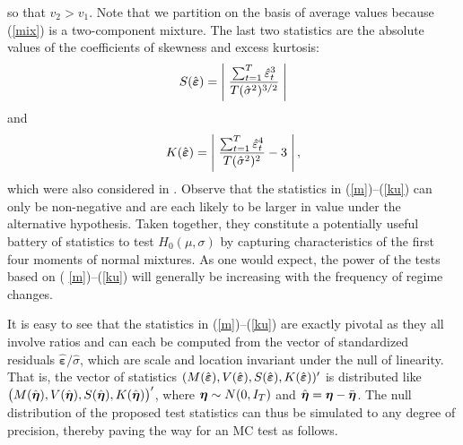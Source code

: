 \documentclass[11pt]{article}
\begin{document}
so that $v_{2}>v_{1}.$ Note that we partition on the basis of average values
because (\ref{mix}) is a two-component mixture. The last two statistics are
the absolute values of the coefficients of skewness and excess kurtosis: 
\begin{equation}
S(\hat{\boldsymbol{\varepsilon }})=\left\vert \;\frac{\sum_{t=1}^{T}\hat{%
\varepsilon}_{t}^{3}}{T(\hat{\sigma}^{2})^{3/2}}\;\right\vert   \label{sk}
\end{equation}%
and 
\begin{equation}
K(\hat{\boldsymbol{\varepsilon }})=\left\vert \;\frac{\sum_{t=1}^{T}\hat{%
\varepsilon}_{t}^{4}}{T(\hat{\sigma}^{2})^{2}}-3\;\right\vert ,  \label{ku}
\end{equation}%
which were also considered in \cite{Cho-White:2007}. Observe that the
statistics in (\ref{m})--(\ref{ku}) can only be non-negative and are each
likely to be larger in value under the alternative hypothesis. Taken
together, they constitute a potentially useful battery of statistics to test 
$H_{0}(\mu ,\sigma )$ by capturing characteristics of the first four moments
of normal mixtures. As one would expect, the power of the tests based on (%
\ref{m})--(\ref{ku}) will generally be increasing with the frequency of
regime changes.

It is easy to see that the statistics in (\ref{m})--(\ref{ku}) are exactly
pivotal as they all involve ratios and can each be computed from the vector
of standardized residuals $\hat{\boldsymbol{\varepsilon }}/\hat{\sigma}$,
which are scale and location invariant under the null of linearity. That is,
the vector of statistics $(M(\hat{\boldsymbol{\varepsilon }}),V(\hat{%
\boldsymbol{\varepsilon }}),S(\hat{\boldsymbol{\varepsilon }}),K(\hat{%
\boldsymbol{\varepsilon }}))^{\prime }$ is distributed like \sloppy$\big(M(%
\hat{\boldsymbol{\eta }}),V(\hat{\boldsymbol{\eta }}),S(\hat{\boldsymbol{%
\eta }}),K(\hat{\boldsymbol{\eta }})\big)^{\prime }$, where $\boldsymbol{%
\eta }\sim N(0,I_{T})$ and $\hat{\boldsymbol{\eta }}=\boldsymbol{\eta }-\bar{%
\boldsymbol{\eta }}$. The null distribution of the proposed test statistics
can thus be simulated to any degree of precision, thereby paving the way for
an MC test as follows. 
\end{document}
